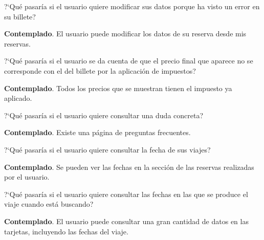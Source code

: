 \begin{escenario} %
    \centering
    ?`Qué pasaría si el usuario quiere modificar sus datos porque ha visto un error en su billete?

    \begin{solucion} \centering
          \textbf{Contemplado}. El usuario puede modificar los datos de su reserva desde mis reservas.
    \end{solucion}
\end{escenario}

\begin{escenario} %
    \centering
    ?`Qué pasaría si el usuario se da cuenta de que el precio final que aparece no se corresponde con el del billete por la aplicación de impuestos?

    \begin{solucion} \centering
          \textbf{Contemplado}. Todos los precios que se muestran tienen el impuesto ya aplicado.

    \end{solucion}
\end{escenario}

\begin{escenario} %
    \centering
    ?`Qué pasaría si el usuario quiere consultar una duda concreta?

    \begin{solucion}
          \centering
          \textbf{Contemplado}. Existe una página de preguntas frecuentes.
    \end{solucion}
\end{escenario}

\begin{escenario} %
  \centering
?`Qué pasaría si el usuario quiere consultar la fecha de sus viajes?

\begin{solucion}
  \centering
  \textbf{Contemplado}. Se pueden ver las fechas en la sección de las reservas realizadas por el usuario.
\end{solucion}
\end{escenario}

\begin{escenario} %
  \centering
?`Qué pasaría si el usuario quiere consultar las fechas en las que se produce el viaje cuando está buscando?

\begin{solucion}
  \centering
  \textbf{Contemplado}. El usuario puede consultar una gran cantidad de datos en las tarjetas, incluyendo las fechas del viaje.
\end{solucion}
\end{escenario}

